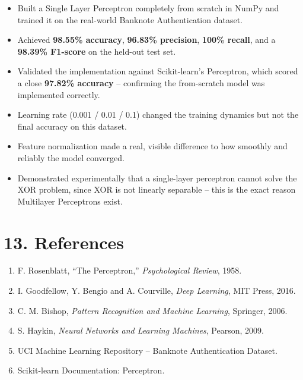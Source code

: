 \documentclass[11pt]{article}
\begin{document}
\begin{itemize}[leftmargin=*]
\item Built a Single Layer Perceptron completely from scratch in NumPy and trained it on the real-world Banknote Authentication dataset.
\item Achieved \textbf{98.55\% accuracy}, \textbf{96.83\% precision}, \textbf{100\% recall}, and a \textbf{98.39\% F1-score} on the held-out test set.
\item Validated the implementation against Scikit-learn's Perceptron, which scored a close \textbf{97.82\% accuracy} -- confirming the from-scratch model was implemented correctly.
\item Learning rate (0.001 / 0.01 / 0.1) changed the training dynamics but not the final accuracy on this dataset.
\item Feature normalization made a real, visible difference to how smoothly and reliably the model converged.
\item Demonstrated experimentally that a single-layer perceptron cannot solve the XOR problem, since XOR is not linearly separable -- this is the exact reason Multilayer Perceptrons exist.
\end{itemize}


\section*{13. References}

\begin{enumerate}
\item F. Rosenblatt, ``The Perceptron,'' \emph{Psychological Review}, 1958.
\item I. Goodfellow, Y. Bengio and A. Courville, \emph{Deep Learning}, MIT Press, 2016.
\item C. M. Bishop, \emph{Pattern Recognition and Machine Learning}, Springer, 2006.
\item S. Haykin, \emph{Neural Networks and Learning Machines}, Pearson, 2009.
\item UCI Machine Learning Repository -- Banknote Authentication Dataset.
\item Scikit-learn Documentation: Perceptron.
\end{enumerate}
\end{document}
